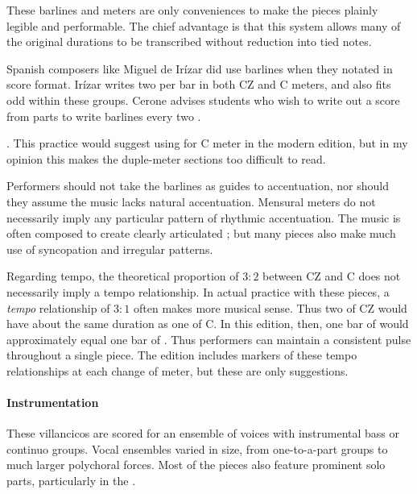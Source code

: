 These barlines and meters are only conveniences to make the pieces plainly 
legible and performable.
The chief advantage is that this system allows many of the original durations 
to be transcribed without reduction into tied notes.

Spanish composers like Miguel de Irízar did use barlines when they notated in 
score format.
Irízar writes two  per bar in both CZ and C meters, and also 
fits odd  within these groups.
Cerone advises students who wish to write out a score from parts to write 
barlines every two .%
  \begin{Footnote}
      \autocite[745]{Cerone:Melopeo}.
      This practice would suggest using  for C meter in the modern 
      edition, but in my opinion this makes the duple-meter sections too difficult to 
      read.
  \end{Footnote}

Performers should not take the barlines as guides to accentuation, nor should 
they assume the music lacks natural accentuation.
Mensural meters do not necessarily imply any particular pattern of rhythmic 
accentuation.
The music is often composed to create clearly articulated ; 
but many pieces also make much use of syncopation and irregular patterns.

Regarding tempo, the theoretical proportion of $3:2$ between CZ and C does not 
necessarily imply a tempo relationship.
In actual practice with these pieces, a \emph{tempo} relationship of $3:1$ 
often makes more musical sense.
Thus two  of CZ would have about the same duration as one 
 of C.
In this edition, then, one bar of  would approximately equal one 
bar of .
Thus performers can maintain a consistent pulse throughout a single piece.
The edition includes markers of these tempo relationships at each change of 
meter, but these are only suggestions.

\paragraph{Instrumentation}

These villancicos are scored for an ensemble of voices with instrumental bass 
or continuo groups.
Vocal ensembles varied in size, from one-to-a-part groups to much larger 
polychoral forces.
Most of the pieces also feature prominent solo parts, particularly in the 
.

